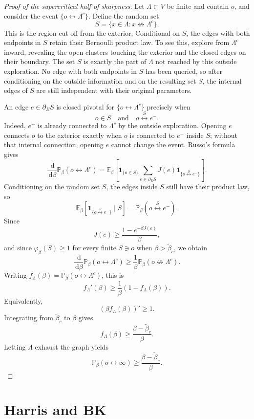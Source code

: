 \documentclass[11pt,reqno]{book}
\numberwithin{equation}{chapter}
\theoremstyle{plain}
\theoremstyle{definition}
\theoremstyle{remark}
\newcommand{\Pb}{\mathbb P_\beta}
\newcommand{\Eb}{\mathbb E_\beta}
\newcommand{\1}{\mathbf 1}
\newcommand{\dd}{\,\mathrm d}
\begin{document}
\begin{proof}[Proof of the supercritical half of sharpness]
Let $\Lambda\subset V$ be finite and contain $o$, and consider the event $\{o\leftrightarrow\Lambda^c\}$. Define the random set
\[
  S=\{x\in\Lambda:x\not\leftrightarrow\Lambda^c\}.
\]
This is the region cut off from the exterior. Conditional on $S$, the edges with both endpoints in $S$ retain their Bernoulli product law. To see this, explore from \(\Lambda^c\) inward, revealing the open clusters touching the exterior and the closed edges on their boundary. The set \(S\) is exactly the part of \(\Lambda\) not reached by this outside exploration. No edge with both endpoints in \(S\) has been queried, so after conditioning on the outside information and on the resulting set \(S\), the internal edges of \(S\) are still independent with their original parameters.

An edge $e\in\partial_E S$ is closed pivotal for $\{o\leftrightarrow\Lambda^c\}$ precisely when
\[
  o\in S
  \quad\text{and}\quad
  o\stackrel S\leftrightarrow e^-.
\]
Indeed, \(e^+\) is already connected to \(\Lambda^c\) by the outside exploration. Opening \(e\) connects \(o\) to the exterior exactly when \(o\) is connected to \(e^-\) inside \(S\); without that internal connection, opening \(e\) cannot change the event.
Russo's formula gives
\[
  \frac{\dd}{\dd\beta}\Pb(o\leftrightarrow\Lambda^c)
  =
  \Eb\left[
  \1_{\{o\in S\}}
  \sum_{e\in\partial_E S}J(e)\1_{\{o\stackrel S\leftrightarrow e^-\}}
  \right].
\]
Conditioning on the random set $S$, the edges inside $S$ still have their product law, so
\[
  \Eb\!\left[
    \1_{\{o\stackrel S\leftrightarrow e^-\}}\mid S
  \right]
  =
  \Pb(o\stackrel S\leftrightarrow e^-).
\]
Since
\[
  J(e)\geq \frac{1-e^{-\beta J(e)}}{\beta},
\]
and since $\varphi_\beta(S)\geq 1$ for every finite $S\ni o$ when $\beta>\widetilde\beta_c$, we obtain
\[
  \frac{\dd}{\dd\beta}\Pb(o\leftrightarrow\Lambda^c)
  \geq
  \frac1\beta\Pb(o\not\leftrightarrow\Lambda^c).
\]
Writing $f_\Lambda(\beta)=\Pb(o\leftrightarrow\Lambda^c)$, this is
\[
  f_\Lambda'(\beta)\geq \frac1\beta(1-f_\Lambda(\beta)).
\]
Equivalently,
\[
  (\beta f_\Lambda(\beta))'\geq 1.
\]
Integrating from $\widetilde\beta_c$ to $\beta$ gives
\[
  f_\Lambda(\beta)\geq \frac{\beta-\widetilde\beta_c}{\beta}.
\]
Letting $\Lambda$ exhaust the graph yields
\[
  \Pb(o\leftrightarrow\infty)
  \geq
  \frac{\beta-\widetilde\beta_c}{\beta}.
\]
\end{proof}

\section{Harris and BK}
\end{document}
